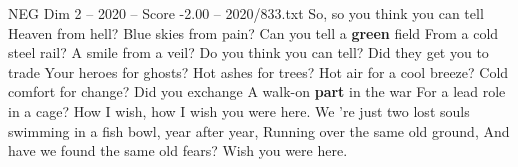\begin{textsample}{NEG Dim 2 – 2020 – Score -2.00 – 2020/833.txt}  \label{ex:f2_neg_029}
So, so you think you can tell Heaven from hell?
Blue skies from pain?
Can you tell a \textbf{green} field From a cold steel rail?
A smile from a veil?
Do you think you can tell?
Did they get you to trade Your heroes for ghosts?
Hot ashes for trees?
Hot air for a cool breeze?
Cold comfort for change?
Did you exchange A walk-on \textbf{part} in the war For a lead role in a cage?
How I wish, how I wish you were here.
We 're just two lost souls swimming in a fish bowl, year after year, Running over the same old ground, And have we found the same old fears?
Wish you were here.

\end{textsample}
